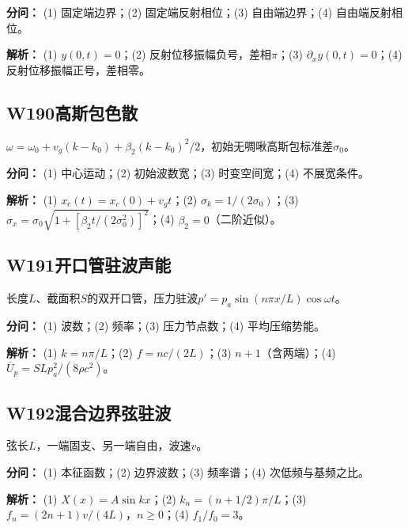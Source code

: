 \par\textbf{分问：} (1) 固定端边界；(2) 固定端反射相位；(3) 自由端边界；(4) 自由端反射相位。

\par\textbf{解析：} (1) $y(0,t)=0$；(2) 反射位移振幅负号，差相$\pi$；(3) $\partial_xy(0,t)=0$；(4) 反射位移振幅正号，差相零。

\medskip

\subsection*{W190\quad 高斯包色散}

$\omega=\omega_0+v_g(k-k_0)+\beta_2(k-k_0)^2/2$，初始无啁啾高斯包标准差$\sigma_0$。

\par\textbf{分问：} (1) 中心运动；(2) 初始波数宽；(3) 时变空间宽；(4) 不展宽条件。

\par\textbf{解析：} (1) $x_c(t)=x_c(0)+v_gt$；(2) $\sigma_k=1/(2\sigma_0)$；(3) $\sigma_x=\sigma_0\sqrt{1+[\beta_2t/(2\sigma_0^2)]^2}$；(4) $\beta_2=0$（二阶近似）。

\medskip

\subsection*{W191\quad 开口管驻波声能}

长度$L$、截面积$S$的双开口管，压力驻波$p'=p_a\sin(n\pi x/L)\cos\omega t$。

\par\textbf{分问：} (1) 波数；(2) 频率；(3) 压力节点数；(4) 平均压缩势能。

\par\textbf{解析：} (1) $k=n\pi/L$；(2) $f=nc/(2L)$；(3) $n+1$（含两端）；(4) $\overline U_p=SLp_a^2/(8\rho c^2)$。

\medskip

\subsection*{W192\quad 混合边界弦驻波}

弦长$L$，一端固支、另一端自由，波速$v$。

\par\textbf{分问：} (1) 本征函数；(2) 边界波数；(3) 频率谱；(4) 次低频与基频之比。

\par\textbf{解析：} (1) $X(x)=A\sin kx$；(2) $k_n=(n+1/2)\pi/L$；(3) $f_n=(2n+1)v/(4L)$，$n\ge0$；(4) $f_1/f_0=3$。

